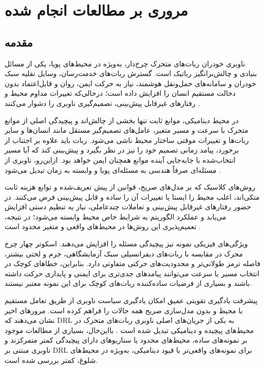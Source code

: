 
\chapter{مروری بر مطالعات انجام شده}
\section{مقدمه}

ناوبری خودران ربات‌های متحرک چرخ‌دار، به‌ویژه در محیط‌های پویا، یکی از مسائل بنیادی و چالش‌برانگیز رباتیک است. گسترش ربات‌های خدمت‌رسان، وسایل نقلیه سبک خودران و سامانه‌های حمل‌ونقل هوشمند، نیاز به حرکت ایمن، روان و قابل‌اعتماد بدون دخالت مستقیم انسان را افزایش داده است؛ درحالی‌که تغییرات مداوم محیط و رفتارهای غیرقابل پیش‌بینی، تصمیم‌گیری ناوبری را دشوار می‌کنند %
\cite{Zhu2021}.

در محیط دینامیکی، موانع ثابت تنها بخشی از چالش‌اند و پیچیدگی اصلی از موانع متحرک با سرعت و مسیر متغیر، عامل‌های تصمیم‌گیر مستقل مانند انسان‌ها و سایر ربات‌ها و تغییرات موقتی ساختار محیط ناشی می‌شود. ربات باید علاوه بر اجتناب از برخورد، پیامد زمانی تصمیم خود را نیز در نظر بگیرد و پیش‌بینی کند که آیا مسیر انتخاب‌شده با جابه‌جایی آینده موانع همچنان ایمن خواهد بود. ازاین‌رو، ناوبری از مسئله‌ای صرفاً هندسی به مسئله‌ای پویا و وابسته به زمان تبدیل می‌شود %
\cite{s25113394}.

روش‌های کلاسیک که بر مدل‌های صریح، قوانین از پیش تعریف‌شده و توابع هزینه ثابت متکی‌اند، اغلب محیط را ایستا یا تغییرات آن را ساده و قابل پیش‌بینی فرض می‌کنند. در حضور رفتارهای غیرقابل پیش‌بینی و تعاملات چندعاملی، نیاز به تنظیم دستی افزایش می‌یابد و عملکرد الگوریتم به شرایط خاص محیط وابسته می‌شود؛ در نتیجه، تعمیم‌پذیری این روش‌ها در محیط‌های واقعی و متغیر محدود است %
\cite{s23249672}.

ویژگی‌های فیزیکی نمونه نیز پیچیدگی مسئله را افزایش می‌دهند. اسکوتر چهار چرخ محرک در مقایسه با ربات‌های دیفرانسیلی سبک آزمایشگاهی، جرم و لختی بیشتر، فاصله ترمز طولانی‌تر و محدودیت‌های حرکتی متفاوتی دارد. بنابراین، خطاهای کوچک در انتخاب مسیر یا سرعت می‌توانند پیامدهای جدی‌تری برای ایمنی و پایداری حرکت داشته باشند و بسیاری از فرضیات ساده‌کننده ربات‌های کوچک برای این نمونه معتبر نیستند.

پیشرفت یادگیری تقویتی عمیق%
امکان یادگیری سیاست ناوبری از طریق تعامل مستقیم با محیط و بدون مدل‌سازی صریح همه حالات را فراهم کرده است. مرورهای اخیر نشان می‌دهند که DRL به یکی از جریان‌های اصلی ناوبری ربات‌های متحرک در محیط‌های پیچیده و دینامیکی تبدیل شده است %
\cite{Zhu2021,s25113394}.
بااین‌حال، بسیاری از مطالعات موجود بر نمونه‌های ساده، محیط‌های محدود یا سناریوهای دارای پیچیدگی  کمتر متمرکزند و ناوبری مبتنی بر DRL برای نمونه‌های واقعی‌تر با قیود دینامیکی، به‌ویژه در محیط‌های شلوغ، کمتر بررسی شده است.

